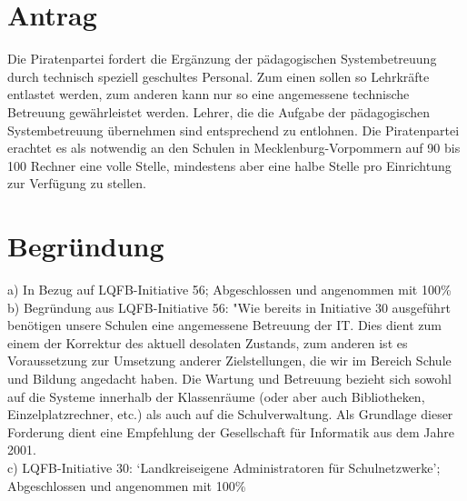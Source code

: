 \section{Antrag}

Die Piratenpartei fordert die Ergänzung der pädagogischen Systembetreuung durch technisch speziell geschultes Personal. Zum einen sollen so Lehrkräfte entlastet werden, zum anderen kann nur so eine angemessene technische Betreuung gewährleistet werden. Lehrer, die die Aufgabe der pädagogischen Systembetreuung übernehmen sind entsprechend zu entlohnen. Die Piratenpartei erachtet es als notwendig an den Schulen in Mecklenburg-Vorpommern auf 90 bis 100 Rechner eine volle Stelle, mindestens aber eine halbe Stelle pro Einrichtung zur Verfügung zu stellen.

\section{Begründung}

a) In Bezug auf LQFB-Initiative 56; Abgeschlossen und angenommen mit 100\% \\b) Begründung aus LQFB-Initiative 56: "Wie bereits in Initiative 30 ausgeführt benötigen unsere Schulen eine angemessene Betreuung der IT. Dies dient zum einem der Korrektur des aktuell desolaten Zustands, zum anderen ist es Voraussetzung zur Umsetzung anderer Zielstellungen, die wir im Bereich Schule und Bildung angedacht haben. Die Wartung und Betreuung bezieht sich sowohl auf die Systeme innerhalb der Klassenräume (oder aber auch Bibliotheken, Einzelplatzrechner, etc.) als auch auf die Schulverwaltung. Als Grundlage dieser Forderung dient eine Empfehlung der Gesellschaft für Informatik aus dem Jahre 2001.\\c) LQFB-Initiative 30: `Landkreiseigene Administratoren für Schulnetzwerke'; Abgeschlossen und angenommen mit 100\%
